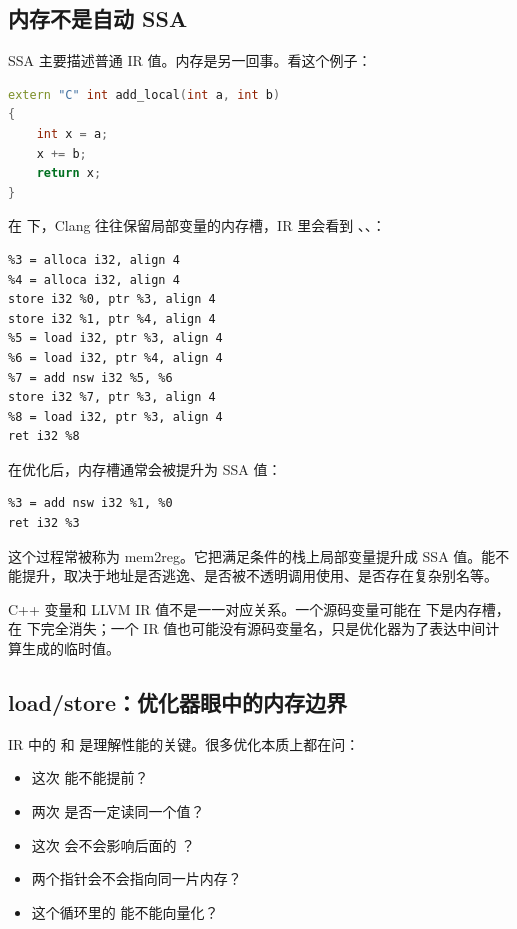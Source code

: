 \subsection{内存不是自动 SSA}

SSA 主要描述普通 IR 值。内存是另一回事。看这个例子：

\begin{lstlisting}[language=C++]
extern "C" int add_local(int a, int b)
{
    int x = a;
    x += b;
    return x;
}
\end{lstlisting}

在  下，Clang 往往保留局部变量的内存槽，IR 里会看到 、、：

\begin{lstlisting}
%3 = alloca i32, align 4
%4 = alloca i32, align 4
store i32 %0, ptr %3, align 4
store i32 %1, ptr %4, align 4
%5 = load i32, ptr %3, align 4
%6 = load i32, ptr %4, align 4
%7 = add nsw i32 %5, %6
store i32 %7, ptr %3, align 4
%8 = load i32, ptr %3, align 4
ret i32 %8
\end{lstlisting}

在优化后，内存槽通常会被提升为 SSA 值：

\begin{lstlisting}
%3 = add nsw i32 %1, %0
ret i32 %3
\end{lstlisting}

这个过程常被称为 mem2reg。它把满足条件的栈上局部变量提升成 SSA 值。能不能提升，取决于地址是否逃逸、是否被不透明调用使用、是否存在复杂别名等。

\begin{warningbox}
C++ 变量和 LLVM IR 值不是一一对应关系。一个源码变量可能在  下是内存槽，在  下完全消失；一个 IR 值也可能没有源码变量名，只是优化器为了表达中间计算生成的临时值。
\end{warningbox}

\subsection{load/store：优化器眼中的内存边界}

IR 中的  和  是理解性能的关键。很多优化本质上都在问：

\begin{itemize}
  \item 这次  能不能提前？
  \item 两次  是否一定读同一个值？
  \item 这次  会不会影响后面的 ？
  \item 两个指针会不会指向同一片内存？
  \item 这个循环里的  能不能向量化？
\end{itemize}

